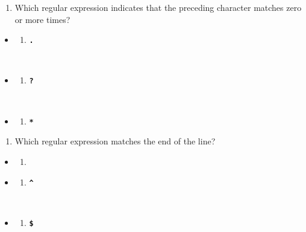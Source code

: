 \documentclass[
  letterpaper,
  DIV=11,
  numbers=noendperiod]{scrreprt}
\providecommand{\tightlist}{%
  \setlength{\itemsep}{0pt}\setlength{\parskip}{0pt}}\usepackage{longtable,booktabs,array}
\begin{document}
\begin{enumerate}
\def\labelenumi{\arabic{enumi}.}
\setcounter{enumi}{8}
\tightlist
\item
  Which regular expression indicates that the preceding character
  matches zero or more times?
\end{enumerate}

\begin{itemize}
\item
  \begin{enumerate}
  \def\labelenumi{(\Alph{enumi})}
  \tightlist
  \item
    \textbf{\texttt{.}}\strut \\
  \end{enumerate}
\item
  \begin{enumerate}
  \def\labelenumi{(\Alph{enumi})}
  \setcounter{enumi}{1}
  \tightlist
  \item
    \textbf{\texttt{?}}\strut \\
  \end{enumerate}
\item
  \begin{enumerate}
  \def\labelenumi{(\Alph{enumi})}
  \setcounter{enumi}{2}
  \tightlist
  \item
    \textbf{\texttt{*}}
  \end{enumerate}
\end{itemize}

\begin{enumerate}
\def\labelenumi{\arabic{enumi}.}
\setcounter{enumi}{9}
\tightlist
\item
  Which regular expression matches the end of the line?
\end{enumerate}

\begin{itemize}
\item
  \begin{enumerate}
  \def\labelenumi{(\Alph{enumi})}
  \tightlist
  \item
    \textbf{\texttt{\textbar{}}}\strut \\
  \end{enumerate}
\item
  \begin{enumerate}
  \def\labelenumi{(\Alph{enumi})}
  \setcounter{enumi}{1}
  \tightlist
  \item
    \textbf{\texttt{\^{}}}\strut \\
  \end{enumerate}
\item
  \begin{enumerate}
  \def\labelenumi{(\Alph{enumi})}
  \setcounter{enumi}{2}
  \tightlist
  \item
    \textbf{\texttt{\$}}
  \end{enumerate}
\end{itemize}
\end{document}
